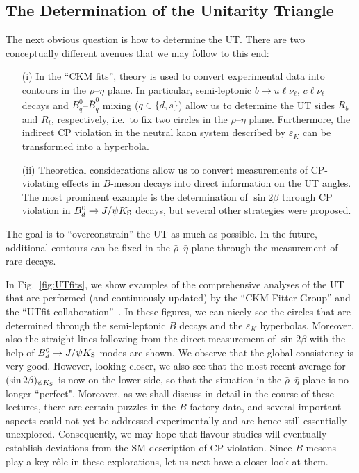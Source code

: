 \documentclass[11pt]{cernrep}
\begin{document}
%
%
%
\subsection{The Determination of the Unitarity Triangle}\label{subsec:CKM-fits}
%
%
%
The next obvious question is how to determine the UT. There are two 
conceptually different avenues that we may follow to this end:
\begin{itemize}
\item[(i)] In the ``CKM fits'', theory is used to convert 
experimental data into contours in the $\bar\rho$--$\bar\eta$ plane. In particular, 
semi-leptonic $b\to u \ell \bar\nu_\ell$, $c \ell \bar\nu_\ell$ decays and 
$B^0_q$--$\bar B^0_q$ mixing ($q\in\{d,s\}$) allow us to determine the UT sides 
$R_b$ and $R_t$, respectively, i.e.\ to fix two circles in the $\bar\rho$--$\bar\eta$ 
plane. Furthermore, the indirect CP violation in the neutral kaon system
described by $\varepsilon_K$ can be transformed into a hyperbola. 
\item[(ii)] Theoretical considerations allow us to convert measurements of 
CP-violating effects in $B$-meson decays into direct information on the UT angles. 
The most prominent example is the determination of $\sin2\beta$ through 
CP violation in $B^0_d\to J/\psi K_{\rm S}$ decays, but several other strategies 
were proposed.
\end{itemize}
The goal is to ``overconstrain'' the UT as much as possible. In the future, 
additional contours can be fixed in the $\bar\rho$--$\bar\eta$ plane through 
the measurement of rare decays. 

In Fig.~\ref{fig:UTfits}, we show examples of the comprehensive
analyses of the UT that are performed (and continuously updated)
by the ``CKM Fitter Group'' \cite{CKMfitter}
and the ``UTfit collaboration''~\cite{UTfit}. In these figures, we can nicely see the
circles that are determined through the semi-leptonic $B$ decays and the 
$\varepsilon_K$ hyperbolas. Moreover, also the straight lines following from the 
direct measurement of $\sin 2\beta$ with the help of $B^0_d\to J/\psi K_{\rm S}$ 
modes are shown. We observe that the global consistency is very good. However,
looking closer, we also see that the most recent average for 
$(\sin 2\beta)_{\psi K_{\rm S}}$ is now on the lower side, so that the situation in 
the $\bar\rho$--$\bar\eta$ plane is no longer ``perfect". Moreover, as we
shall discuss in detail in the course of these lectures, there are certain puzzles in the
$B$-factory data, and several important aspects could not yet be addressed
experimentally and are hence still essentially unexplored. Consequently, we may hope
that flavour studies will eventually establish deviations from the SM description 
of CP violation. Since $B$ mesons play a key r\^ole in these explorations, let us 
next have a closer look at them. 
\end{document}
